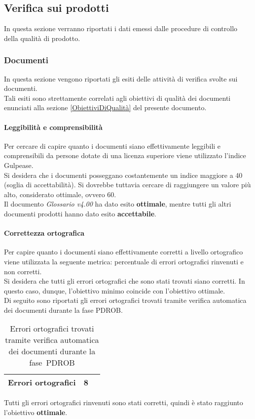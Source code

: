 \documentclass[../PianoDiQualifica.tex]{subfiles}
\begin{document}
\begin{appendices}
			
	\subsection{Verifica sui prodotti}
	In questa sezione verranno riportati i dati emessi dalle procedure di controllo della qualità di prodotto\g.
		\subsubsection{Documenti}
		In questa sezione vengono riportati gli esiti delle attività di verifica svolte sui documenti.\\
		Tali esiti sono strettamente correlati agli obiettivi di qualità dei documenti enunciati alla sezione \ref{ObiettiviDiQualità} del presente documento.
			
			\paragraph{Leggibilità e comprensibilità}
			Per cercare di capire quanto i documenti siano effettivamente leggibili e comprensibili da persone dotate di una licenza superiore viene utilizzato l’indice Gulpease\g.\\
			Si desidera che i documenti posseggano costantemente un indice maggiore a 40 (soglia di accettabilità). Si dovrebbe tuttavia cercare di raggiungere un valore più alto, considerato ottimale, ovvero 60.\\
			Il documento \textit{Glossario v4.00} ha dato esito \textbf{ottimale}, mentre tutti gli altri documenti prodotti hanno dato esito \textbf{accettabile}.
			
			\paragraph{Correttezza ortografica}
			Per capire quanto i documenti siano effettivamente corretti a livello ortografico viene utilizzata la seguente metrica: percentuale di errori ortografici rinvenuti e non corretti.\\
			Si desidera che tutti gli errori ortografici che sono stati trovati siano corretti. In questo caso, dunque, l'obiettivo minimo coincide con l'obiettivo ottimale.\\
			Di seguito sono riportati gli errori ortografici trovati tramite verifica automatica dei documenti durante la fase PDROB.
			\begin{table}[H]
				\centering
				\begin{tabular}{l * {2}{c}}
					\midrule
					Errori ortografici & 8 \\
					\midrule
				\end{tabular}
				\caption{Errori ortografici trovati tramite verifica automatica dei documenti durante la fase\g\ PDROB}
				\label{tab:errori_automatica}
			\end{table}
			Tutti gli errori ortografici rinvenuti sono stati corretti, quindi è stato raggiunto l'obiettivo \textbf{ottimale}.
			

\end{appendices}
\end{document}
